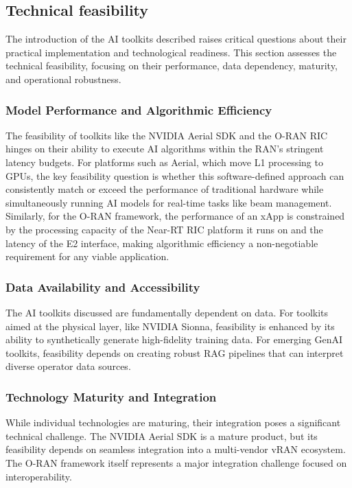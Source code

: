 \documentclass[conference]{IEEEtran}
\begin{document}
\subsection{Technical feasibility}
The introduction of the AI toolkits described raises critical questions about their practical implementation and technological readiness. This section assesses the technical feasibility, focusing on their performance, data dependency, maturity, and operational robustness.

\subsubsection{Model Performance and Algorithmic Efficiency}
The feasibility of toolkits like the NVIDIA Aerial SDK and the O-RAN RIC hinges on their ability to execute AI algorithms within the RAN’s stringent latency budgets. For platforms such as Aerial, which move L1 processing to GPUs, the key feasibility question is whether this software-defined approach can consistently match or exceed the performance of traditional hardware while simultaneously running AI models for real-time tasks like beam management. Similarly, for the O-RAN framework, the performance of an xApp is constrained by the processing capacity of the Near-RT RIC platform it runs on and the latency of the E2 interface, making algorithmic efficiency a non-negotiable requirement for any viable application.

\subsubsection{Data Availability and Accessibility}
The AI toolkits discussed are fundamentally dependent on data. For toolkits aimed at the physical layer, like NVIDIA Sionna, feasibility is enhanced by its ability to synthetically generate high-fidelity training data. For emerging GenAI toolkits, feasibility depends on creating robust RAG pipelines that can interpret diverse operator data sources.

\subsubsection{Technology Maturity and Integration}
While individual technologies are maturing, their integration poses a significant technical challenge. The NVIDIA Aerial SDK is a mature product, but its feasibility depends on seamless integration into a multi-vendor vRAN ecosystem. The O-RAN framework itself represents a major integration challenge focused on interoperability.
\end{document}
